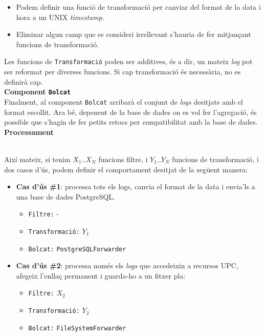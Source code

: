 \begin{itemize}
    \item Podem definir una funció de transformació per canviar del format de la data i hora a un UNIX \textit{\gls{timestamp}}.
    \item Eliminar algun camp que es consideri irrellevant s’hauria de fer mitjançant funcions de transformació.
\end{itemize}

\noindent
Les funcions de \texttt{Transformació} poden ser additives, és a dir, un mateix \textit{\gls{log}} pot ser reformat per diverses funcions.
Si cap transformació és necessària, no es definirà cap. \\

\noindent
\textbf{Component \texttt{Bolcat}} \\

\noindent
Finalment, al component \texttt{Bolcat} arribarà el conjunt de \textit{\gls{log}s} desitjats amb el format escollit.
Ara bé, depenent de la base de dades on es vol fer l’agregació, és possible que s’hagin de fer petits retocs per compatibilitat amb la base de dades. \\

\noindent
\textbf{Processament}

\noindent \\
Així mateix, si tenim \(X_1\)..\(X_N\) funcions filtre, i \(Y_1\)..\(Y_N\) funcions de transformació, i dos casos d’ús, podem definir el comportament desitjat de la següent manera:

\begin{itemize}
    \item \textbf{Cas d'ús \#1}: processa tots els logs, canvia el format de la data i envia'ls a una base de dades PostgreSQL.
    \begin{itemize}
        \item \texttt{Filtre:} -
        \item \texttt{Transformació:} \(Y_1\)
        \item \texttt{Bolcat:} \texttt{PostgreSQLForwarder}
    \end{itemize}
    \item \textbf{Cas d'ús \#2}: processa només els \textit{\gls{log}s} que accedeixin a recursos UPC, afegeix l’enllaç permanent i guarda-ho a un fitxer pla:
    \begin{itemize}
        \item \texttt{Filtre:} \(X_2\)
        \item \texttt{Transformació:} \(Y_2\)
        \item \texttt{Bolcat:} \texttt{FileSystemForwarder}
    \end{itemize}
\end{itemize}

